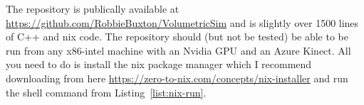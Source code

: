 \begin{invisBox}
    \hfill
\end{invisBox}

The repository is publically available at \url{https://github.com/RobbieBuxton/VolumetricSim} and is slightly over 1500 lines of C++ and nix code. The repository should (but not be tested) be able to be run from any x86-intel machine with an Nvidia GPU and an Azure Kinect. All you need to do is install the nix package manager which I recommend downloading from here \url{https://zero-to-nix.com/concepts/nix-installer} and run the shell command from Listing~\ref{list:nix-run}.

